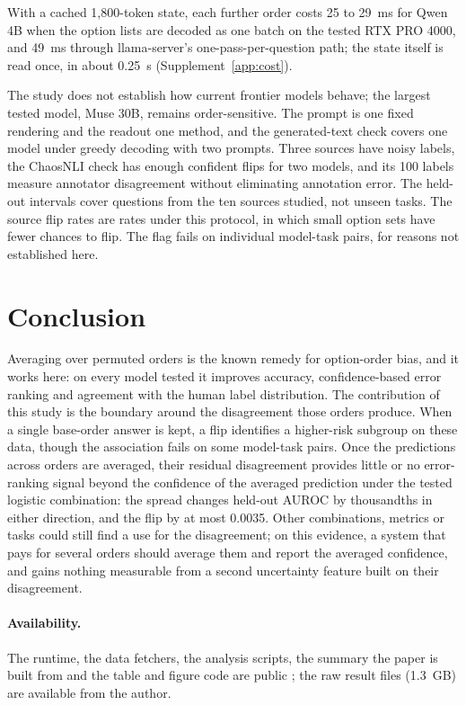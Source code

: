 \documentclass[10pt,twocolumn]{article}
\begin{document}
With a cached 1,800-token state, each further order costs 25 to 29~ms for Qwen 4B when the option lists are decoded as one batch on the tested RTX PRO 4000, and 49~ms through llama-server's one-pass-per-question path; the state itself is read once, in about 0.25~s (Supplement~\ref{app:cost}).

The study does not establish how current frontier models behave; the largest tested model, Muse 30B, remains order-sensitive. The prompt is one fixed rendering and the readout one method, and the generated-text check covers one model under greedy decoding with two prompts. Three sources have noisy labels, the ChaosNLI check has enough confident flips for two models, and its 100 labels measure annotator disagreement without eliminating annotation error. The held-out intervals cover questions from the ten sources studied, not unseen tasks. The source flip rates are rates under this protocol, in which small option sets have fewer chances to flip. The flag fails on individual model-task pairs, for reasons not established here.

\section{Conclusion}

Averaging over permuted orders is the known remedy for option-order bias, and it works here: on every model tested it improves accuracy, confidence-based error ranking and agreement with the human label distribution. The contribution of this study is the boundary around the disagreement those orders produce. When a single base-order answer is kept, a flip identifies a higher-risk subgroup on these data, though the association fails on some model-task pairs. Once the predictions across orders are averaged, their residual disagreement provides little or no error-ranking signal beyond the confidence of the averaged prediction under the tested logistic combination: the spread changes held-out AUROC by thousandths in either direction, and the flip by at most 0.0035. Other combinations, metrics or tasks could still find a use for the disagreement; on this evidence, a system that pays for several orders should average them and report the averaged confidence, and gains nothing measurable from a second uncertainty feature built on their disagreement.

\paragraph{Availability.} The runtime, the data fetchers, the analysis scripts, the summary the paper is built from and the table and figure code are public \citep{llav2026}; the raw result files (1.3~GB) are available from the author.
\end{document}
